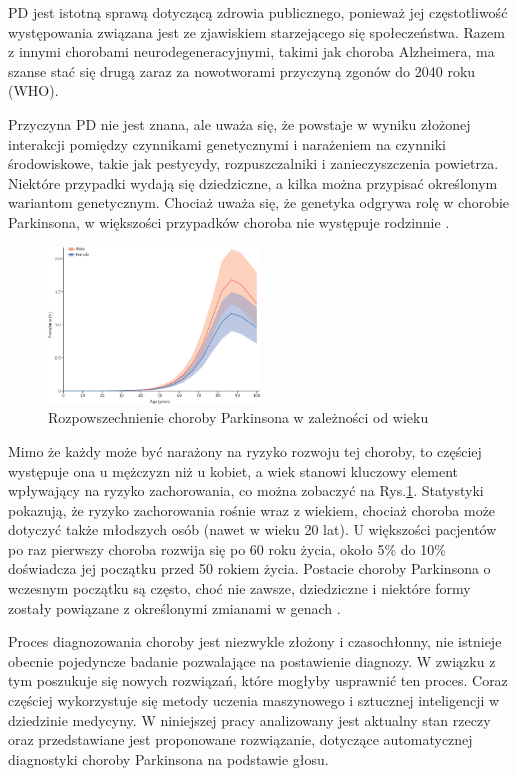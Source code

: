 PD jest istotną sprawą dotyczącą zdrowia publicznego, ponieważ jej częstotliwość występowania związana jest ze zjawiskiem starzejącego się społeczeństwa.
Razem z innymi chorobami neurodegeneracyjnymi, takimi jak choroba Alzheimera, ma szanse stać się drugą zaraz za nowotworami przyczyną zgonów do 2040 roku (WHO).

Przyczyna PD nie jest znana, ale uważa się, że powstaje w wyniku złożonej interakcji pomiędzy czynnikami genetycznymi i
narażeniem na czynniki środowiskowe, takie jak pestycydy, rozpuszczalniki i zanieczyszczenia powietrza.
Niektóre przypadki wydają się dziedziczne, a kilka można przypisać określonym wariantom genetycznym.
Chociaż uważa się, że genetyka odgrywa rolę w chorobie Parkinsona, w większości przypadków choroba nie występuje rodzinnie \cite{National_Institute_on_Aging_2022}.

\begin{figure}[htbp]
	\centering
	\includegraphics[width=0.5\textwidth]{./img/PD_prevalence}
	\caption{Rozpowszechnienie choroby Parkinsona w zależności od wieku \cite{global_PD}}
    \label{fig:PD_prevalance}
\end{figure}

Mimo że każdy może być narażony na ryzyko rozwoju tej choroby, to częściej występuje ona u mężczyzn niż u kobiet,
a wiek stanowi kluczowy element wpływający na ryzyko zachorowania, co można zobaczyć na Rys.\ref{fig:PD_prevalance}.
Statystyki pokazują, że ryzyko zachorowania rośnie wraz z wiekiem, chociaż choroba może dotyczyć także młodszych osób (nawet w wieku 20 lat).
U większości pacjentów po raz pierwszy choroba rozwija się po 60 roku życia, około 5\% do 10\% doświadcza jej początku przed 50 rokiem życia.
Postacie choroby Parkinsona o wczesnym początku są często, choć nie zawsze, dziedziczne i niektóre formy zostały powiązane z
określonymi zmianami w genach \cite{National_Institute_on_Aging_2022}.

Proces diagnozowania choroby jest niezwykle złożony i czasochłonny, nie istnieje obecnie pojedyncze badanie pozwalające na postawienie diagnozy.
W związku z tym poszukuje się nowych rozwiązań, które mogłyby usprawnić ten proces.
Coraz częściej wykorzystuje się metody uczenia maszynowego i sztucznej inteligencji w dziedzinie medycyny.
W niniejszej pracy analizowany jest aktualny stan rzeczy oraz przedstawiane jest proponowane rozwiązanie, dotyczące automatycznej diagnostyki
choroby Parkinsona na podstawie głosu.

